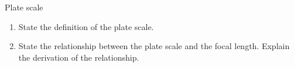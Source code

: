\documentclass[main.tex]{subfiles}
\begin{document}
\begin{q}{5}
Plate scale
\begin{enumerate}[label=\text{(\alph*)}]
    \item State the definition of the plate scale.
    \item State the relationship between the plate scale and the focal length.
    Explain the derivation of the relationship.
\end{enumerate}
\end{q}

\begin{sol}
\begin{subsol}
    
\end{subsol}

\begin{subsol}
    
\end{subsol}
\end{sol}
\end{document}
